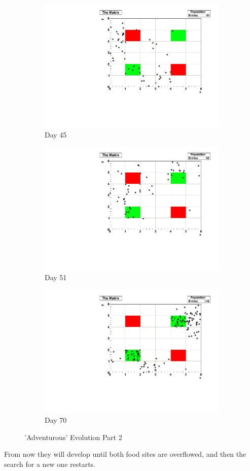 \documentclass[a4paper,prd,twocolumn,nofootinbib,superscriptaddress,floatfix]{revtex4}
\begin{document}
\begin{figure}[H] 
  \begin{subfigure}[b]{0.5\linewidth}
    \centering
    \includegraphics[width=0.9\linewidth]{a_45.pdf} 
    \caption{Day 45} 
    \label{fig7:a} 
    \vspace{4ex}
  \end{subfigure}%
  \begin{subfigure}[b]{0.5\linewidth}
    \centering
    \includegraphics[width=0.9\linewidth]{a_51.pdf} 
    \caption{Day 51} 
    \label{fig7:b} 
    \vspace{4ex}
  \end{subfigure} 
  \begin{subfigure}[b]{\linewidth}
    \centering
    \includegraphics[width=0.6\linewidth]{a_70.pdf} 
    \caption{Day 70} 
    \label{fig7:c} 
  \end{subfigure}%
  \caption{'Adventurous' Evolution Part 2}
  \label{fig:7} 
\end{figure}
From now they will develop until both food sites are overflowed, and then the search for a new one restarts.
\end{document}
